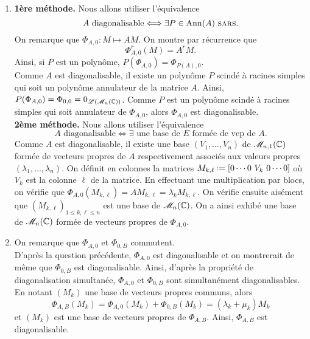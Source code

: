 \begin{solution}
    \begin{enumerate}
        \item \textbf{1ère méthode.} Nous allons utiliser l'équivalence
        $$A \text{ diagonalisable} \Longleftrightarrow \exists P \in \mathrm{Ann}(A) \text{ \textsc{sars}}.$$
        On remarque que $\Phi_{A, 0}: M \mapsto AM$. On montre par récurrence que 
        $$\Phi_{A, 0}^r(M) = A^r M.$$
        Ainsi, si $P$ est un polynôme, $P(\Phi_{A, 0}) = \Phi_{P(A), 0}$. \\
        Comme $A$ est diagonalisable, il existe un polynôme $P$ scindé à racines simples qui soit un polynôme annulateur de la matrice $A$. Ainsi, $P(\Phi_{A, 0}) = \Phi_{0, 0} = 0_{\mathscr{L} \left( \mathscr{M}_n(\mathbb{C}) \right)}$. Comme $P$ est un polynôme scindé à racines simples qui soit annulateur de $\Phi_{A, 0}$, alors $\Phi_{A, 0}$ est diagonalisable. \\
        \textbf{2ème méthode.} Nous allons utiliser l'équivalence 
        $$A \text{  diagonalisable} \Longleftrightarrow \exists \text{ une base de $E$ formée de vep de $A$}.$$
        Comme $A$ est diagonalisable, il existe une base $(V_1, \dots, V_n)$ de $\mathscr{M}_{n,1}(\mathbb{C})$ formée de vecteurs propres de $A$ respectivement associés aux valeurs propres $(\lambda_1, \dots, \lambda_n)$. On définit en colonnes la matrices $M_{k, \ell} \defeq [ 0 \cdots 0\ V_k\ 0 \cdots 0]$ où $V_k$ est la colonne $\ell$ de la matrice. En effectuant une multiplication par blocs, on vérifie que $\Phi_{A, 0}(M_{k, \ell}) = A M_{k, \ell} = \lambda_k M_{k, \ell}$. On vérifie ensuite aisément que $(M_{k, \ell})_{1 \leqslant k, \ell \leqslant n}$ est une base de $\mathscr{M}_n(\mathbb{C})$. On a ainsi exhibé une base de $\mathscr{M}_n(\mathbb{C})$ formée de vecteurs propres de $\Phi_{A, 0}$. 
        \item On remarque que $\Phi_{A, 0}$ et $\Phi_{0, B}$ commutent. \\
        D'après la question précédente, $\Phi_{A, 0}$ est diagonalisable et on montrerait de même que $\Phi_{0, B}$ est diagonalisable. Ainsi, d'après la propriété de diagonalisation simultanée, $\Phi_{A, 0}$ et $\Phi_{0, B}$ sont simultanément diagonalisables. \\
        En notant $(M_k)$ une base de vecteurs propres communs, alors
        $$\Phi_{A, B} (M_k) = \Phi_{A, 0} (M_k) + \Phi_{0, B} (M_k) = (\lambda_k + \mu_k) M_k$$
        et $(M_k)$ est une base de vecteurs propres de $\Phi_{A, B}$. Ainsi, $\Phi_{A, B}$ est diagonalisable. 
    \end{enumerate}
\end{solution}